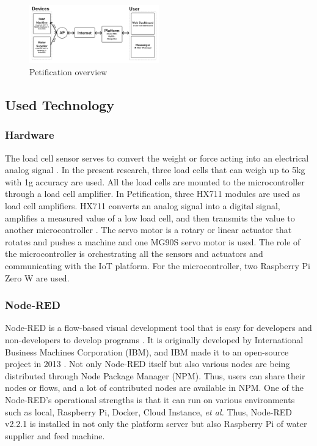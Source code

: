 \documentclass[conference]{IEEEtran}
\begin{document}
\begin{figure}[htbp]
\centerline{\includegraphics[width=0.5\textwidth]{./images/Overview.png}}
\caption{Petification overview}
\label{fig}
\end{figure}

\subsection{Used Technology}
\subsubsection{Hardware}
The load cell sensor serves to convert the weight or force acting into an electrical analog signal \cite{b14}. In the present research, three load cells that can weigh up to 5kg with 1g accuracy are used.
All the load cells are mounted to the microcontroller through a load cell amplifier. In Petification, three HX711 modules are used as load cell amplifiers. HX711 converts an analog signal into a digital signal, amplifies a measured value of a low load cell, and then transmits the value to another microcontroller \cite{b15}. 
The servo motor is a rotary or linear actuator that rotates and pushes a machine \cite{b16} and one MG90S servo motor is used.
The role of the microcontroller is orchestrating all the sensors and actuators and communicating with the IoT platform. For the microcontroller, two Raspberry Pi Zero W are used.

\subsubsection{Node-RED}
Node-RED is a flow-based visual development tool that is easy for developers and non-developers to develop programs \cite{b17}.
It is originally developed by International Business Machines Corporation (IBM), and IBM made it to an open-source project in 2013 \cite{b8}. Not only Node-RED itself but also various nodes are being distributed through Node Package Manager (NPM). Thus, users can share their nodes or flows, and a lot of contributed nodes are available in NPM.
One of the Node-RED’s operational strengths is that it can run on various environments such as local, Raspberry Pi, Docker, Cloud Instance, \textit{et al.} Thus, Node-RED v2.2.1 is installed in not only the platform server but also Raspberry Pi of water supplier and feed machine.
\end{document}
